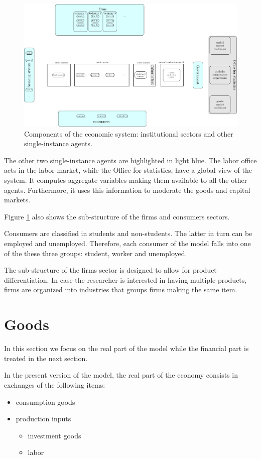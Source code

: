 \documentclass{book}
\begin{document}
\begin{figure}[htp]
\hskip-1cm\includegraphics[scale=0.5]{agents_and_interactions_figure1c1-0.pdf}
	\caption{Components of the economic system: institutional sectors and other single-instance agents.}
	\label{fig:componentsc1}
\end{figure}

The other two single-instance agents are highlighted in light blue. The labor office acts in the labor market, while the Office for statistics, have a global view of the system. It computes aggregate variables making them available to all the other agents. Furthermore, it uses this information to moderate the goods and capital markets.

Figure \ref{fig:componentsc1} also shows the sub-structure of the firms and consumers sectors. 

Consumers are classified in students and non-students. The latter in turn can be employed and unemployed. Therefore, each consumer of the model falls into one of the these three groups: student, worker and unemployed.

The sub-structure of the firms sector is designed to allow for product differentiation. In case the researcher is interested in having multiple products, firms are organized into industries that groups firms making the same item.


\clearpage
\section{Goods}
In this section we focus on the real part of the model while the financial part is treated in the next section.

In the present version of the model, the real part of the economy consists in exchanges of the following items:
\begin{itemize}
	\item consumption goods
	\item production inputs
		\begin{itemize}
			\item investment goods
			\item labor
		\end{itemize}
\end{itemize}
\end{document}
